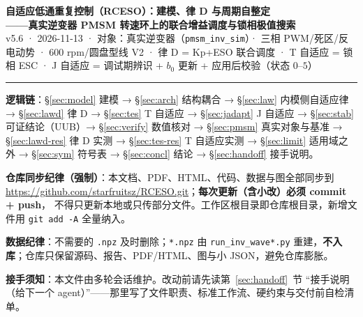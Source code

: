 \documentclass[11pt,a4paper]{article}
\theoremstyle{remark}\newtheorem{remark}{注}
\begin{document}
\begin{center}
{\Large\bfseries 自适应低通重复控制（RCESO）：建模、律 D 与周期自整定}\\[3pt]
{\small\bfseries ——真实逆变器 PMSM 转速环上的联合增益调度与锁相极值搜索}\\[4pt]
{\small v5.6 · 2026-11-13 · 对象：真实逆变器（\texttt{pmsm\_inv\_sim}）· 三相 PWM/死区/反电动势 · 600 rpm/圆盘型线 V2 · 律 D = Kp+ESO 联合调度 · T 自适应 = 锁相 ESC · J 自适应 = 调试期辨识 + $b_0$ 更新 + 应用后校验（状态 $0$--$5$）}
\end{center}
\vspace{-1mm}\noindent\rule{\textwidth}{0.4pt}\vspace{-1mm}
\noindent\textbf{逻辑链}：\S\ref{sec:model} 建模 → \S\ref{sec:arch} 结构耦合 → \S\ref{sec:law} 内模侧自适应律 → \S\ref{sec:lawd} 律 D → \S\ref{sec:tes} T 自适应 → \S\ref{sec:jadapt} J 自适应 → \S\ref{sec:stab} 可证结论（UUB）→ \S\ref{sec:verify} 数值核对 → \S\ref{sec:pmsm} 真实对象与基准 → \S\ref{sec:lawd-res} 律 D 实测 → \S\ref{sec:tes-res} T 自适应实测 → \S\ref{sec:limit} 适用域之外 → \S\ref{sec:sym} 符号表 → \S\ref{sec:concl} 结论 → \S\ref{sec:handoff} 接手说明。
\vspace{1mm}

\noindent\textbf{仓库同步纪律（强制）}：本文档、PDF、HTML、代码、数据与图全部同步到
\url{https://github.com/starfruitsz/RCESO.git}；\textbf{每次更新（含小改）必须 commit + push}，
不得只更新本地或只传部分文件。工作区根目录即仓库根目录，新增文件用 \texttt{git add -A} 全量纳入。

\noindent\textbf{数据纪律}：不需要的 \texttt{.npz} 及时删除；\texttt{*.npz} 由 \texttt{run\_inv\_wave*.py}
重建，\textbf{不入库}；仓库只保留源码、报告、PDF/HTML、图与小 JSON，避免仓库膨胀。

\noindent{}

\vspace{1mm}
\noindent{}
\vspace{1mm}
\noindent\textbf{接手须知}：本文件由多轮会话维护。改动前请先读第~\ref{sec:handoff}~节
“接手说明（给下一个 agent）”——那里写了文件职责、标准工作流、硬约束与交付前自检清单。
\end{document}
